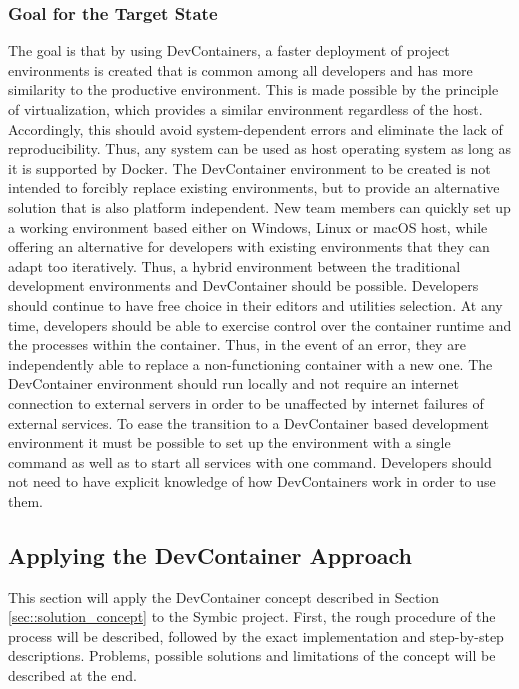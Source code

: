 \documentclass[12pt, a4paper]{article}
\begin{document}
        \subsubsection{Goal for the Target State}\label{sssec::goal}
        The goal is that by using DevContainers, a faster deployment of project environments is created that is common among all developers and has more similarity to the productive environment. This is made possible by the principle of virtualization, which provides a similar environment regardless of the host. Accordingly, this should avoid system-dependent errors and eliminate the lack of reproducibility. Thus, any system can be used as host operating system as long as it is supported by Docker. The DevContainer environment to be created is not intended to forcibly replace existing environments, but to provide an alternative solution that is also platform independent. New team members can quickly set up a working environment based either on Windows, Linux or macOS host, while offering an alternative for developers with existing environments that they can adapt too iteratively. Thus, a hybrid environment between the traditional development environments and DevContainer should be possible. Developers should continue to have free choice in their editors and utilities selection.\newline
        At any time, developers should be able to exercise control over the container runtime and the processes within the container. Thus, in the event of an error, they are independently able to replace a non-functioning container with a new one. The DevContainer environment should run locally and not require an internet connection to external servers in order to be unaffected by internet failures of external services. To ease the transition to a DevContainer based development environment it must be possible to set up the environment with a single command as well as to start all services with one command. Developers should not need to have explicit knowledge of how DevContainers work in order to use them.

    \subsection{Applying the DevContainer Approach}\label{ssec::apply}
    This section will apply the DevContainer concept described in Section \ref{sec::solution_concept} to the Symbic project. First, the rough procedure of the process will be described, followed by the exact implementation and step-by-step descriptions. Problems, possible solutions and limitations of the concept will be described at the end.
\end{document}
